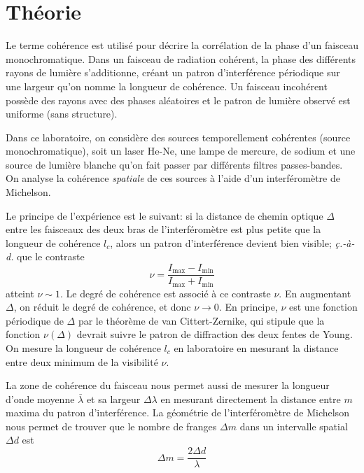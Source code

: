 \documentclass[10pt,letterpaper,twocolumn]{article}
\begin{document}
\section{Théorie}\label{sec:theorie} %
Le terme cohérence est utilisé pour décrire la corrélation de la phase d'un faisceau monochromatique\supercite{Pedrotti}. Dans un faisceau de radiation cohérent, la phase des différents rayons de lumière s'additionne, créant un patron d'interférence périodique sur une largeur qu'on nomme la longueur de cohérence. Un faisceau incohérent possède des rayons avec des phases aléatoires et le patron de lumière observé est uniforme (sans structure). \par
Dans ce laboratoire, on considère des sources temporellement cohérentes (source monochromatique), soit un laser He-Ne, une lampe de mercure, de sodium et une source de lumière blanche qu'on fait passer par différents filtres passes-bandes. On analyse la cohérence \textit{spatiale} de ces sources à l'aide d'un interféromètre de Michelson. \par
Le principe de l'expérience est le suivant: si la distance de chemin optique $\Delta$ entre les faisceaux des deux bras de l'interféromètre est plus petite que la longueur de cohérence $l_c$, alors un patron d'interférence devient bien visible; \textit{ç.-à-d.} que le contraste 
	\begin{equation}\label{eq:nu}
	\nu = \frac{I_{\max} - I_{\min}}{I_{\max} + I_{\min}}
\end{equation}
atteint $\nu \sim 1$. Le degré de cohérence est associé à ce contraste $\nu$. En augmentant $\Delta$, on réduit le degré de cohérence, et donc $\nu \rightarrow 0$. En principe, $\nu$ est une fonction périodique de $\Delta$ par le théorème de van Cittert-Zernike, qui stipule que la fonction $\nu(\Delta)$ devrait suivre 
le patron de diffraction des deux fentes de Young\supercite{McCutchen1966}. On mesure la longueur de cohérence $l_c$ en laboratoire en mesurant la distance entre deux minimum de la visibilité $\nu$. \par
La zone de cohérence du faisceau nous permet aussi de mesurer la longueur d'onde moyenne $\bar{\lambda}$ et sa largeur $\Delta \lambda$ en mesurant directement la distance entre $m$ maxima du patron d'interférence. La géométrie de l'interféromètre de Michelson nous permet de trouver que le nombre de franges $\Delta m$ dans un intervalle spatial $\Delta d$ est\supercite{Pedrotti}
\begin{equation}\label{eq:deltaM}
	\Delta m = \frac{2 \Delta d}{\lambda}
\end{equation}\par
\end{document}
